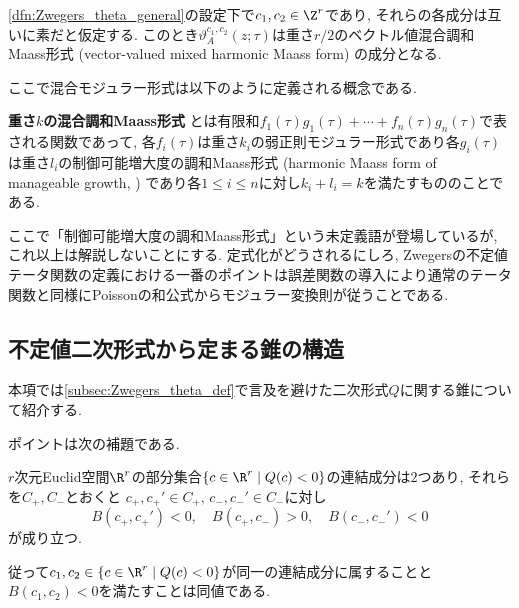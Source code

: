 \documentclass[11pt,b5paper,oneside,lualatex]{ltjsarticle} %
\numberwithin{equation}{section} %
\begin{document}
\begin{thm}
	\cref{dfn:Zwegers_theta_general}の設定下で$ c_1, c_2 \in \Z^r $であり, それらの各成分は互いに素だと仮定する. 
	このとき$ \vartheta_{A}^{c_1, c_2} \left( z; \tau \right) $は重さ$ r/2 $のベクトル値混合調和Maass形式 (vector-valued mixed harmonic Maass form) の成分となる. 
\end{thm}

ここで混合モジュラー形式は以下のように定義される概念である. 

\begin{dfn}
	\textbf{重さ$ k $の混合調和Maass形式}%
	とは有限和$ f_1(\tau) g_1(\tau) + \cdots + f_n(\tau) g_n(\tau) $で表される関数であって, 各$ f_i(\tau) $は重さ$ k_i $の弱正則モジュラー形式であり各$ g_i(\tau) $は重さ$ l_i $の制御可能増大度の調和Maass形式 (harmonic Maass form of manageable growth, \cite[Definition 4.1]{BFOR}) であり各$ 1 \le i \le n $に対し$ k_i + l_i = k $を満たすもののことである. 
\end{dfn}

ここで「制御可能増大度の調和Maass形式」という未定義語が登場しているが, これ以上は解説しないことにする. 
定式化がどうされるにしろ, Zwegersの不定値テータ関数の定義における一番のポイントは誤差関数の導入により通常のテータ関数と同様にPoissonの和公式からモジュラー変換則が従うことである. 



\subsection{不定値二次形式から定まる錐の構造} \label{subsec:cone}


本項では\cref{subsec:Zwegers_theta_def}で言及を避けた二次形式$ Q $に関する錐について紹介する. 

ポイントは次の補題である. 

\begin{lem} \label{lem:cone}
	$ r $次元Euclid空間$ \R^r $の部分集合$ \{ c \in \R^r \mid Q(c) < 0 \} $の連結成分は$ 2 $つあり, それらを$ C_+, C_- $とおくと
	$ c_+, c_+' \in C_+, \, c_-, c_-' \in C_- $に対し
	\[
	B(c_+, c_+') < 0, \quad
	B(c_+, c_-) > 0, \quad
	B(c_-, c_-') < 0
	\]
	が成り立つ. 
	
	従って$ c_1, c_2 \in \{ c \in \R^r \mid Q(c) < 0 \} $が同一の連結成分に属することと$ B(c_1, c_2) < 0 $を満たすことは同値である. 
\end{lem}
\end{document}
